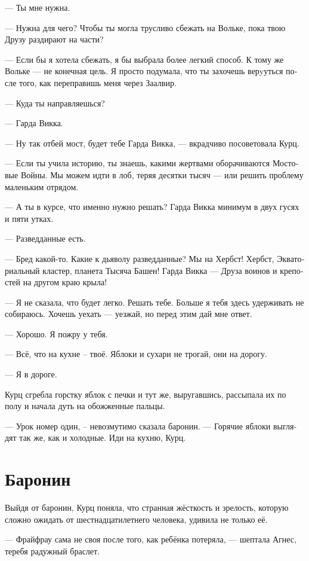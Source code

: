 \documentclass[a4paper,12pt,fleqn]{book}\usepackage{cooltooltips}\usepackage{polyglossia}\setdefaultlanguage[babelshorthands=true]{russian}\setotherlanguage{english}\defaultfontfeatures{Ligatures=TeX,Mapping=tex-text} \usepackage{xcolor}\definecolor{lightgray}{HTML}{bbbbbb}\color{lightgray}\newcommand{\ml}[3]{\textenglish{\textcolor{black}{#3}}}
\begin{document}
--- Ты мне нужна.

--- Нужна для чего?
Чтобы ты могла трусливо сбежать на Вольке, пока твою Друзу раздирают на части?

--- Если бы я хотела сбежать, я бы выбрала более легкий способ.
К тому же Вольке --- не конечная цель.
Я просто подумала, что ты захочешь верyуться после того, как переправишь меня через Заалвир.

--- Куда ты направляешься?

--- Гарда Викка.

--- Ну так отбей мост, будет тебе Гарда Викка, --- вкрадчиво посоветовала Курц.

--- Если ты учила историю, ты знаешь, какими жертвами оборачиваются Мостовые Войны.
Мы можем идти в лоб, теряя десятки тысяч --- или решить проблему маленьким отрядом.

--- А ты в курсе, что именно нужно решать?
Гарда Викка минимум в двух гусях и пяти утках.

--- Разведданные есть.

--- Бред какой-то.
Какие к дьяволу разведданные?
Мы на Хербст!
Хербст, Экваториальный кластер, планета Тысяча Башен!
Гарда Викка --- Друза воинов и крепостей на другом краю крыла!

--- Я не сказала, что будет легко.
Решать тебе.
Больше я тебя здесь удерживать не собираюсь.
Хочешь уехать --- уезжай, но перед этим дай мне ответ.

--- Хорошо.
Я пожру у тебя.

--- Всё, что на кухне -- твоё.
Яблоки и сухари не трогай, они на дорогу.

--- Я в дороге.

Курц сгребла горстку яблок с печки и тут же, выругавшись, рассыпала их по полу и начала дуть на обожженные пальцы.

--- Урок номер один, -- невозмутимо сказала баронин.
--- Горячие яблоки выглядят так же, как и холодные.
Иди на кухню, Курц.

\section{Баронин}

Выйдя от баронин, Курц поняла, что странная жёсткость и зрелость, которую сложно ожидать от шестнадцатилетнего человека, удивила не только её.

--- Фрайфрау сама не своя после того, как ребёнка потеряла, --- шептала Агнес, теребя радужный браслет.
\end{document}
